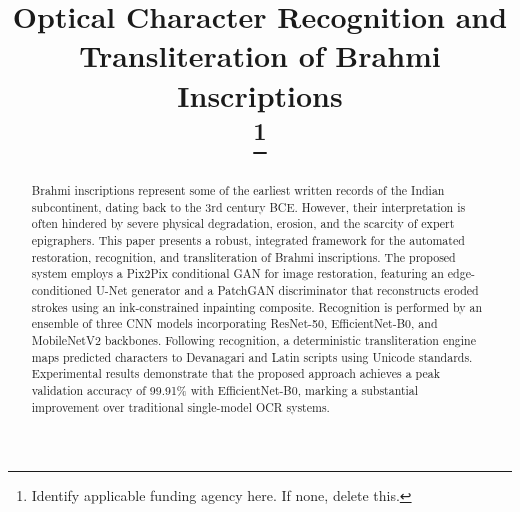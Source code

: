 \documentclass[conference]{IEEEtran}
\begin{document}
\title{Optical Character Recognition and Transliteration of Brahmi Inscriptions\\
\thanks{Identify applicable funding agency here. If none, delete this.}}

\author{
\and
{}
\and
{}
\and
{}
}

\maketitle

\begin{abstract}
Brahmi inscriptions represent some of the earliest written records of the Indian subcontinent, dating back to the 3rd century BCE. However, their interpretation is often hindered by severe physical degradation, erosion, and the scarcity of expert epigraphers. This paper presents a robust, integrated framework for the automated restoration, recognition, and transliteration of Brahmi inscriptions. The proposed system employs a Pix2Pix conditional GAN for image restoration, featuring an edge-conditioned U-Net generator and a PatchGAN discriminator that reconstructs eroded strokes using an ink-constrained inpainting composite. Recognition is performed by an ensemble of three CNN models incorporating ResNet-50, EfficientNet-B0, and MobileNetV2 backbones. Following recognition, a deterministic transliteration engine maps predicted characters to Devanagari and Latin scripts using Unicode standards. Experimental results demonstrate that the proposed approach achieves a peak validation accuracy of 99.91\% with EfficientNet-B0, marking a substantial improvement over traditional single-model OCR systems.
\end{abstract}
\end{document}
